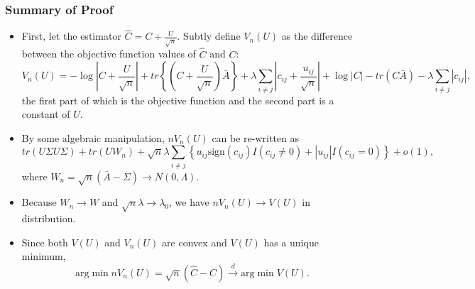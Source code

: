 \documentclass[11pt]{article} %
\begin{document}
\subsubsection{Summary of Proof}
\begin{itemize}
\item First, let the estimator $\hat{C}=C+\frac{U}{\sqrt{n}}$. Subtly define $V_n(U)$ as the difference between the objective function values of $\hat{C}$ and $C$: \[V_n(U)=-\log\left\vert C+\frac{U}{\sqrt{n}}\right\vert +tr\left\lbrace \left( C+\frac{U}{\sqrt{n}}\right) \bar{A}\right\rbrace +\lambda \sum_{i\neq j} \left\vert c_{ij}+\frac{u_{ij}}{\sqrt{n}}\right\vert +\log|C|-tr(C\bar{A})-\lambda \sum_{i\neq j}|c_{ij}|\mbox{,}\]
the first part of which is the objective function and the second part is a constant of $U$. 
\item By some algebraic manipulation, $nV_n(U)$ can be re-written as \[tr(U\Sigma U\Sigma )+tr(UW_n)+\sqrt{n} \lambda \sum_{i\neq j}\left\lbrace u_{ij} \mbox{sign} (c_{ij})I(c_{ij}\neq 0)+|u_{ij}| I(c_{ij} =0)\right\rbrace +o(1)\mbox{,}\]
where $W_n=\sqrt{n}(\bar{A}-\Sigma)\rightarrow N(0,\Lambda)$. 
\item Because $W_n\rightarrow W$ and $\sqrt{n} \lambda \rightarrow \lambda_0$, we have $nV_n(U)\rightarrow V(U)$ in distribution. 
\item Since both $V(U)$ and $V_n(U)$ are convex and $V(U)$ has a unique minimum, \[\mbox{arg} \min nV_n\left( U\right)=\sqrt{n} \left( \hat{C} - C\right) \stackrel{d}{\rightarrow} \mbox{arg} \min V\left( U\right) \mbox{.} \]
\end{itemize}
\end{document}
